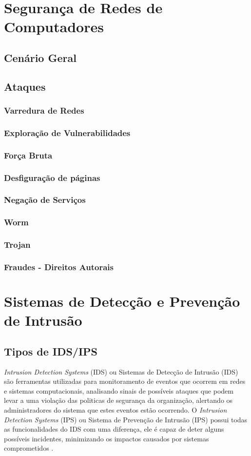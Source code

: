 \documentclass[
	12pt,				
	openright,		
	twoside,	
	a4paper,
	english,	
	brazil	
	]{abntex2}
\begin{document}
\chapter{Segurança de Redes de Computadores}
\section{Cenário Geral}
\section{Ataques}
\subsection{Varredura de Redes}
\subsection{Exploração de Vulnerabilidades}
\subsection{Força Bruta}
\subsection{Desfiguração de páginas}
\subsection{Negação de Serviços}
\subsection{Worm}
\subsection{Trojan}
\subsection{Fraudes - Direitos Autorais}
\chapter{Sistemas de Detecção e Prevenção de Intrusão}
\section{Tipos de IDS/IPS}

\textit{Intrusion Detection Systems} (IDS) ou Sistemas de Detecção de Intrusão (IDS) são ferramentas utilizadas para monitoramento de eventos que ocorrem em redes e sistemas computacionais, analisando sinais de possíveis ataques que podem levar a uma violação das politicas de segurança da organização, alertando os administradores do sistema que estes eventos estão ocorrendo. O \textit{Intrusion Detection Systems} (IPS) ou Sistema de Prevenção de Intrusão (IPS) possui todas as funcionalidades do IDS com uma diferença, ele é capaz de deter alguns possíveis incidentes, minimizando os impactos causados por sistemas comprometidos \cite{mukhopadhyay01}.
\end{document}
